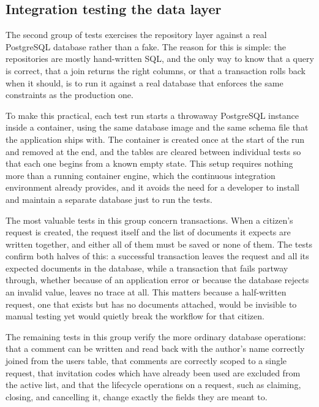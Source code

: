 \subsection{Integration testing the data layer}

\par The second group of tests exercises the repository layer against a real PostgreSQL database rather than a fake. The reason for this is simple: the repositories are mostly hand-written SQL, and the only way to know that a query is correct, that a join returns the right columns, or that a transaction rolls back when it should, is to run it against a real database that enforces the same constraints as the production one.

\par To make this practical, each test run starts a throwaway PostgreSQL instance inside a container, using the same database image and the same schema file that the application ships with. The container is created once at the start of the run and removed at the end, and the tables are cleared between individual tests so that each one begins from a known empty state. This setup requires nothing more than a running container engine, which the continuous integration environment already provides, and it avoids the need for a developer to install and maintain a separate database just to run the tests.

\par The most valuable tests in this group concern transactions. When a citizen's request is created, the request itself and the list of documents it expects are written together, and either all of them must be saved or none of them. The tests confirm both halves of this: a successful transaction leaves the request and all its expected documents in the database, while a transaction that fails partway through, whether because of an application error or because the database rejects an invalid value, leaves no trace at all. This matters because a half-written request, one that exists but has no documents attached, would be invisible to manual testing yet would quietly break the workflow for that citizen.

\par The remaining tests in this group verify the more ordinary database operations: that a comment can be written and read back with the author's name correctly joined from the users table, that comments are correctly scoped to a single request, that invitation codes which have already been used are excluded from the active list, and that the lifecycle operations on a request, such as claiming, closing, and cancelling it, change exactly the fields they are meant to.

